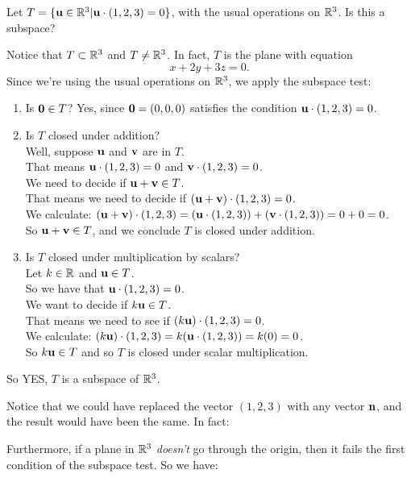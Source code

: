 \begin{myprob} Let $T = \{ \mathbf{u} \in \mathbb{R}^3 | \mathbf{u} \cdot (1,2,3) = 0\}$,
with the usual operations on $\mathbb{R}^3$.  Is this a subspace?

\begin{mysol} Notice that $T \subset \mathbb{R}^3$ and $T \neq \mathbb{R}^3$.  In fact, 
$T$ is the plane with equation
$$
x + 2y + 3z= 0.
$$
Since we're using the usual operations on $\mathbb{R}^3$, we apply
the subspace test:
\begin{enumerate}
\item Is $\mathbf{0} \in T$?  Yes, since $\mathbf{0} = (0,0,0)$ satisfies
the condition $\mathbf{u} \cdot (1,2,3) = 0$.
\item Is $T$ closed under addition? \\
 Well, suppose $\mathbf{u}$ and $\mathbf{v}$
are in $T$. \\
 That means $\mathbf{u} \cdot (1,2,3) = 0$ and $\mathbf{v} \cdot (1,2,3) = 0$.  \\
We need to decide if $\mathbf{u} + \mathbf{v} \in T$.  \\
That means we
need to decide if $(\mathbf{u} + \mathbf{v}) \cdot (1,2,3) = 0$. \\
 We calculate: $(\mathbf{u} + \mathbf{v}) \cdot (1,2,3) = (\mathbf{u} \cdot (1,2,3)) + (\mathbf{v} \cdot (1,2,3)) = 0 + 0 = 0$.\\
So $\mathbf{u} + \mathbf{v} \in T$, and we conclude $T$ is closed under addition.
\item Is $T$ closed under multiplication by scalars?\\
Let $k \in \mathbb{R}$ and $\mathbf{u} \in T$.  \\
So we have that $\mathbf{u} \cdot (1,2,3) = 0$.\\
We want to decide if $k\mathbf{u} \in T$.\\
That means we need to see if $(k\mathbf{u})\cdot (1,2,3) = 0$.\\
We calculate: $(k\mathbf{u})\cdot (1,2,3) = k(\mathbf{u} \cdot (1,2,3)) = k(0) = 0$.\\
So $k\mathbf{u} \in T$ and so $T$ is closed under scalar multiplication.
\end{enumerate}
So YES, $T$ is a subspace of $\mathbb{R}^3$. \end{mysol}\end{myprob}

Notice that we could have replaced the vector $(1,2,3)$ with any
vector $\mathbf{n}$, and the result would have been the same.  In
fact:


Furthermore, if a plane in $\mathbb{R}^3$ \emph{doesn't} go through
the origin, then it fails the first condition of the subspace
test.  So we have:


